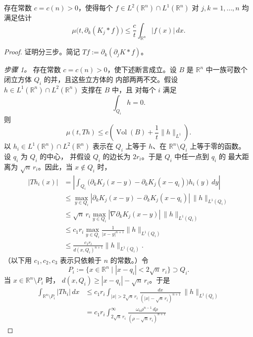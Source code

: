 \begin{lemma}\label{lem:B-2-10}
存在常数 $c=c(n)>0$，使得每个
$f\in L^2(\mathbb R^n)\cap L^1(\mathbb R^n)$ 对
$j,k=1,\ldots,n$ 均满足估计
\[
  \mu\bigl(t,\partial_k(K_j*f)\bigr)
  \le\frac{c}{t}\int_{\mathbb R^n}|f(x)|\,dx.
\]
\end{lemma}

\begin{proof}
证明分三步。简记 $Tf:=\partial_k(\partial_jK*f)$。

\emph{步骤 1。}
存在常数 $c=c(n)>0$，使下述断言成立。设 $B$ 是
$\mathbb R^n$ 中一族可数个闭立方体 $Q_i$ 的并，且这些立方体的
内部两两不交。假设 $h\in L^1(\mathbb R^n)\cap L^2(\mathbb R^n)$
支撑在 $B$ 中，且
对每个 $i$ 满足
\[
  \int_{Q_i}h=0.
\]
则
\[
  \mu(t,Th)\le c\left(\operatorname{Vol}(B)
    +\frac1t\|h\|_{L^1}\right).
\]
以 $h_i\in L^1(\mathbb R^n)\cap L^2(\mathbb R^n)$ 表示在 $Q_i$
上等于 $h$、在 $\mathbb R^n\setminus Q_i$ 上等于零的函数。
设 $q_i$ 为 $Q_i$ 的中心，
并假设 $Q_i$ 的边长为 $2r_i$。于是 $Q_i$ 中任一点到 $q_i$ 的
最大距离为 $\sqrt n\,r_i$。因此，当 $x\notin Q_i$ 时，
\begin{align*}
  |Th_i(x)|
  &=\left|\int_{Q_i}\bigl(\partial_kK_j(x-y)
    -\partial_kK_j(x-q_i)\bigr)h_i(y)\,dy\right|\\
  &\le\max_{y\in Q_i}|\partial_kK_j(x-y)
    -\partial_kK_j(x-q_i)|\,\|h\|_{L^1(Q_i)}\\
  &\le\sqrt n\,r_i\max_{y\in Q_i}
    |\nabla\partial_kK_j(x-y)|\,\|h\|_{L^1(Q_i)}\\
  &\le c_1r_i\max_{y\in Q_i}\frac1{|x-y|^{n+1}}
    \|h\|_{L^1(Q_i)}\\
  &\le\frac{c_1r_i}{d(x,Q_i)^{n+1}}\|h\|_{L^1(Q_i)}.
\end{align*}
（以下用 $c_1,c_2,c_3$ 表示只依赖于 $n$ 的常数。）令
\[
  P_i:=\bigl\{x\in\mathbb R^n\mid
    |x-q_i|<2\sqrt n\,r_i\bigr\}\supset Q_i.
\]
当 $x\in\mathbb R^n\setminus P_i$ 时，
$d(x,Q_i)\ge|x-q_i|-\sqrt n\,r_i$。于是
\begin{align*}
  \int_{\mathbb R^n\setminus P_i}|Th_i|\,dx
  &\le c_1r_i\int_{|x|>2\sqrt n\,r_i}
    \frac{dx}{(|x|-\sqrt n\,r_i)^{n+1}}\,
    \|h\|_{L^1(Q_i)}\\
  &=c_1r_i\int_{2\sqrt n\,r_i}^{\infty}
    \frac{\omega_n\rho^{n-1}\,d\rho}
      {(\rho-\sqrt n\,r_i)^{n+1}}\,

\end{align*}
\end{proof}
